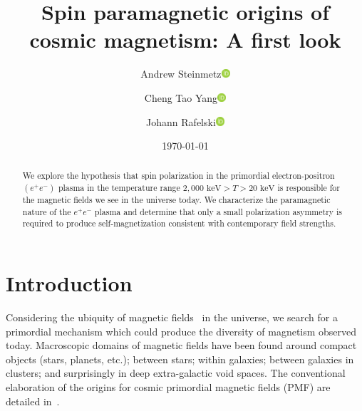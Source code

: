 \documentclass[reprint]{revtex4-2}
\newcommand{\orcidicon}{\includegraphics[width=0.32cm]{orcid.pdf}}
\newcommand{\orc}[1]{\href{https://orcid.org/#1}{\orcidicon}}
\newcommand{\orcA}{0000-0001-8217-1484}
\newcommand{\orcB}{0000-0001-5038-8427}
\newcommand{\orcC}{0000-0001-5474-2649}
\newcommand*{\keV}{\text{ keV}}
\newcommand*{\xblue}{\color{black}}
\begin{document}
\title{Spin paramagnetic origins of cosmic magnetism: A first look}
\author{Andrew Steinmetz\orc{\orcC}}
\author{Cheng Tao Yang\orc{\orcB}}
\author{Johann Rafelski\orc{\orcA}}

\date{\today}

\begin{abstract}
    We explore the hypothesis that spin polarization in the primordial electron-positron $(e^{+}e^{-})$ plasma in the temperature range $2,000\keV>T>20\keV$ is responsible for the magnetic fields we see in the universe today. We characterize the paramagnetic nature of the $e^{+}e^{-}$ plasma and determine that only a small polarization asymmetry is required to produce self-magnetization consistent with contemporary field strengths.
\end{abstract}


\maketitle

\section{Introduction}
\label{sec:introduction}
\noindent  
Considering the ubiquity of magnetic fields~\cite{giovannini2003magnetized,kronberg1994extragalactic} in the universe, we search for a primordial mechanism which could produce {\xblue the diversity of magnetism observed today.} Macroscopic domains of magnetic fields have been found around compact objects (stars, planets, etc.); between stars; within galaxies; between galaxies in clusters; and surprisingly in deep extra-galactic void spaces. The conventional elaboration of the origins for cosmic  primordial magnetic fields (PMF) are detailed in~\cite{gaensler2004origin,durrer2013cosmological,batista2021gammaray}.
\end{document}
